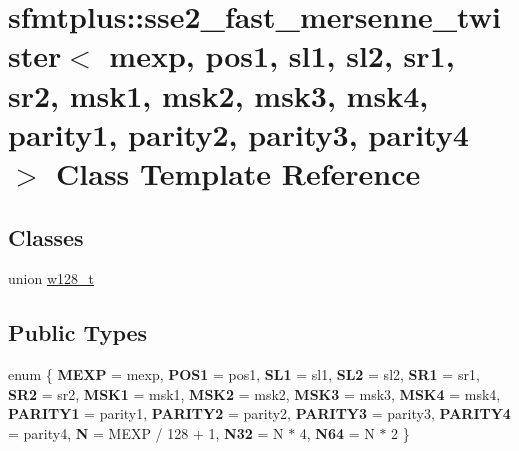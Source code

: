 \hypertarget{classsfmtplus_1_1sse2__fast__mersenne__twister}{
\section{sfmtplus\-:\-:sse2\-\_\-fast\-\_\-mersenne\-\_\-twister$<$ mexp, pos1, sl1, sl2, sr1, sr2, msk1, msk2, msk3, msk4, parity1, parity2, parity3, parity4 $>$ \-Class \-Template \-Reference}
\label{classsfmtplus_1_1sse2__fast__mersenne__twister}
}
\subsection*{\-Classes}
\begin{DoxyCompactItemize}
\item 
union \hyperlink{unionsfmtplus_1_1sse2__fast__mersenne__twister_1_1w128__t}{w128\-\_\-t}
\end{DoxyCompactItemize}
\subsection*{\-Public \-Types}
\begin{DoxyCompactItemize}
\item 
enum \{ \*
{\bfseries \-M\-E\-X\-P} =  mexp, 
{\bfseries \-P\-O\-S1} =  pos1, 
{\bfseries \-S\-L1} =  sl1, 
{\bfseries \-S\-L2} =  sl2, 
\*
{\bfseries \-S\-R1} =  sr1, 
{\bfseries \-S\-R2} =  sr2, 
{\bfseries \-M\-S\-K1} =  msk1, 
{\bfseries \-M\-S\-K2} =  msk2, 
\*
{\bfseries \-M\-S\-K3} =  msk3, 
{\bfseries \-M\-S\-K4} =  msk4, 
{\bfseries \-P\-A\-R\-I\-T\-Y1} =  parity1, 
{\bfseries \-P\-A\-R\-I\-T\-Y2} =  parity2, 
\*
{\bfseries \-P\-A\-R\-I\-T\-Y3} =  parity3, 
{\bfseries \-P\-A\-R\-I\-T\-Y4} =  parity4, 
{\bfseries \-N} =  \-M\-E\-X\-P / 128 + 1, 
{\bfseries \-N32} =  \-N $\ast$ 4, 
\*
{\bfseries \-N64} =  \-N $\ast$ 2
 \}
\end{DoxyCompactItemize}

